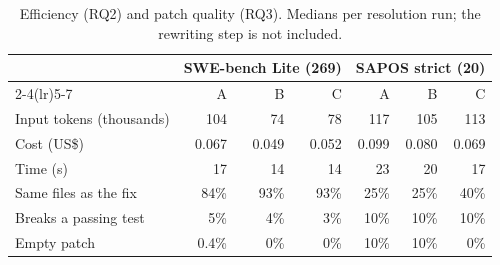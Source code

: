 \begin{table}[t]
\caption{Efficiency (RQ2) and patch quality (RQ3). Medians per resolution run; the rewriting step is not included.}
\label{tab:rq2rq3}
\small
\setlength{\tabcolsep}{3.5pt}
\begin{tabular}{lrrrrrr}
\toprule
 & \multicolumn{3}{c}{SWE-bench Lite (269)} & \multicolumn{3}{c}{SAPOS strict (20)} \\
\cmidrule(lr){2-4}\cmidrule(lr){5-7}
 & A & B & C & A & B & C \\
\midrule
Input tokens (thousands) & 104 & 74 & 78 & 117 & 105 & 113 \\
Cost (US\$) & 0.067 & 0.049 & 0.052 & 0.099 & 0.080 & 0.069 \\
Time (s) & 17 & 14 & 14 & 23 & 20 & 17 \\
\midrule
Same files as the fix & 84\% & 93\% & 93\% & 25\% & 25\% & 40\% \\
Breaks a passing test & 5\% & 4\% & 3\% & 10\% & 10\% & 10\% \\
Empty patch & 0.4\% & 0\% & 0\% & 10\% & 10\% & 0\% \\
\bottomrule
\end{tabular}
\end{table}
